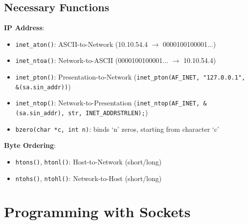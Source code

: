 \documentclass[10pt]{article}
\begin{document}
\subsection{Necessary Functions}
\textbf{IP Address}:
\begin{itemize}
\item \texttt{inet\_aton()}: ASCII-to-Network (10.10.54.4 $\rightarrow$ 0000100100001$\dots$)
\item \texttt{inet\_ntoa()}: Network-to-ASCII (0000100100001$\dots$ $\rightarrow$ 10.10.54.4)
\item \texttt{inet\_pton()}: Presentation-to-Network (\texttt{inet\_pton(AF\_INET, "127.0.0.1", \&(sa.sin\_addr))})
\item \texttt{inet\_ntop()}: Network-to-Presentation (\texttt{inet\_ntop(AF\_INET, \&(sa.sin\_addr), str, INET\_ADDRSTRLEN);})
\item \texttt{bzero(char *c, int n)}: binds `n' zeros, starting from character `c'
\end{itemize}
\textbf{Byte Ordering}:
\begin{itemize}
\item \texttt{htons()}, \texttt{htonl()}: Host-to-Network (short/long)
\item \texttt{ntohs()}, \texttt{ntohl()}: Network-to-Host (short/long)
\end{itemize}

\section{Programming with Sockets}
\end{document}
